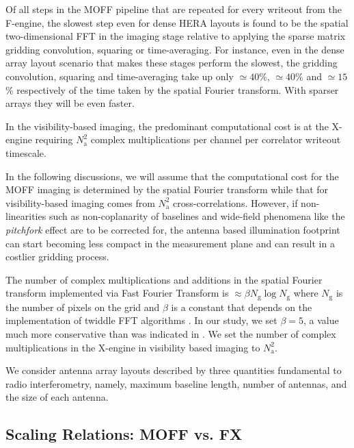 \documentclass[a4paper,fleqn,usenatbib]{../mnras}
\begin{document}
Of all steps in the MOFF pipeline that are repeated for every writeout from 
the F-engine, the slowest step even for dense HERA 
layouts is found to be the spatial two-dimensional FFT in the imaging stage 
relative to applying the sparse matrix gridding convolution, squaring or 
time-averaging. For instance, even in the dense array layout scenario that 
makes these stages perform the slowest, the gridding convolution, squaring and 
time-averaging take up only $\simeq 40$\%, $\simeq 40$\% and $\simeq 15$\% 
respectively of the time taken by the spatial Fourier transform. With sparser 
arrays they will be even faster. 

In the visibility-based imaging, the predominant computational cost is at
the X-engine requiring $N_\textrm{a}^2$ complex multiplications per channel 
per correlator writeout timescale. 

In the following discussions, we will assume that the computational cost for
the MOFF imaging is determined by the spatial Fourier transform while  
that for visibility-based imaging comes from $N_\textrm{a}^2$ 
cross-correlations. However, if non-linearities such 
as non-coplanarity of baselines \citep{cor08} and wide-field phenomena like 
the {\it pitchfork} effect \citep{thy15a,thy15b} are to be corrected for, 
the antenna based illumination footprint can start becoming less compact
in the measurement plane and can result in a costlier gridding process.

The number of complex multiplications and additions in the spatial Fourier 
transform implemented via Fast Fourier Transform \citep[FFT;][]{coo65} is 
$\approx \beta N_\textrm{g}\log N_\textrm{g}$ where $N_\textrm{g}$ 
is the number of pixels on the grid and $\beta$ is a constant that depends on 
the implementation of twiddle FFT algorithms \citep{bri74}. In our study, we 
set $\beta=5$, a value much more conservative than was indicated in 
\citet{mor11}. We set the number of complex multiplications in the X-engine 
in visibility based imaging to $N_\textrm{a}^2$.

We consider antenna array layouts described by three quantities fundamental
to radio interferometry, namely, maximum baseline length, number of antennas,
and the size of each antenna. 


\subsection{Scaling Relations: MOFF vs. FX}
\end{document}
